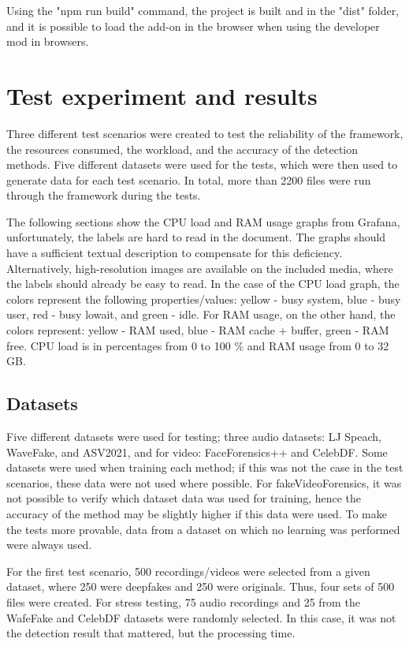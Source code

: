 Using the "npm run build" command, the project is built and in the "dist" folder, and it is possible to load the add-on in the browser when using the developer mod in browsers.

\chapter{Test experiment and results}

Three different test scenarios were created to test the reliability of the framework, the resources consumed, the workload, and the accuracy of the detection methods. Five different datasets were used for the tests, which were then used to generate data for each test scenario. In total, more than 2200 files were run through the framework during the tests.

The following sections show the CPU load and RAM usage graphs from Grafana, unfortunately, the labels are hard to read in the document. The graphs should have a sufficient textual description to compensate for this deficiency. Alternatively, high-resolution images are available on the included media, where the labels should already be easy to read. In the case of the CPU load graph, the colors represent the following properties/values: yellow - busy system, blue - busy user, red - busy lowait, and green - idle. For RAM usage, on the other hand, the colors represent: yellow - RAM used, blue - RAM cache + buffer, green - RAM free. CPU load is in percentages from 0 to 100 \% and RAM usage from 0 to 32 GB.

\section{Datasets}
\label{section:datasets}

Five different datasets were used for testing; three audio datasets: LJ Speach, WaveFake, and ASV2021, and for video: FaceForensics++ and CelebDF. Some datasets were used when training each method; if this was not the case in the test scenarios, these data were not used where possible. For fakeVideoForensics, it was not possible to verify which dataset data was used for training, hence the accuracy of the method may be slightly higher if this data were used. To make the tests more provable, data from a dataset on which no learning was performed were always used.

For the first test scenario, 500 recordings/videos were selected from a given dataset, where 250 were deepfakes and 250 were originals. Thus, four sets of 500 files were created. For stress testing, 75 audio recordings and 25 from the WafeFake and CelebDF datasets were randomly selected. In this case, it was not the detection result that mattered, but the processing time.

